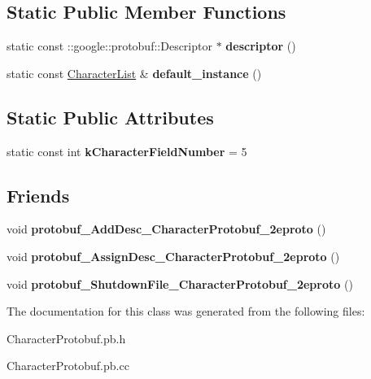 \subsection*{Static Public Member Functions}
\begin{DoxyCompactItemize}
\item 
static const \+::google\+::protobuf\+::\+Descriptor $\ast$ {\bfseries descriptor} ()\hypertarget{classCharacterList_aace6de641ed334c6d6a4cbbe7714ca8b}{}\label{classCharacterList_aace6de641ed334c6d6a4cbbe7714ca8b}

\item 
static const \hyperlink{classCharacterList}{Character\+List} \& {\bfseries default\+\_\+instance} ()\hypertarget{classCharacterList_aa180968dade6512bfa0e9c21b57b0b84}{}\label{classCharacterList_aa180968dade6512bfa0e9c21b57b0b84}

\end{DoxyCompactItemize}
\subsection*{Static Public Attributes}
\begin{DoxyCompactItemize}
\item 
static const int {\bfseries k\+Character\+Field\+Number} = 5\hypertarget{classCharacterList_a4290f8fc798d31c54076ae65c2401ca3}{}\label{classCharacterList_a4290f8fc798d31c54076ae65c2401ca3}

\end{DoxyCompactItemize}
\subsection*{Friends}
\begin{DoxyCompactItemize}
\item 
void {\bfseries protobuf\+\_\+\+Add\+Desc\+\_\+\+Character\+Protobuf\+\_\+2eproto} ()\hypertarget{classCharacterList_aa491aa56977170cd80caf7b8176ae84c}{}\label{classCharacterList_aa491aa56977170cd80caf7b8176ae84c}

\item 
void {\bfseries protobuf\+\_\+\+Assign\+Desc\+\_\+\+Character\+Protobuf\+\_\+2eproto} ()\hypertarget{classCharacterList_a510135aa7690c32c0b8f2f1b539199aa}{}\label{classCharacterList_a510135aa7690c32c0b8f2f1b539199aa}

\item 
void {\bfseries protobuf\+\_\+\+Shutdown\+File\+\_\+\+Character\+Protobuf\+\_\+2eproto} ()\hypertarget{classCharacterList_aa03453ef0dc13477cc670111c24af42a}{}\label{classCharacterList_aa03453ef0dc13477cc670111c24af42a}

\end{DoxyCompactItemize}


The documentation for this class was generated from the following files\+:\begin{DoxyCompactItemize}
\item 
Character\+Protobuf.\+pb.\+h\item 
Character\+Protobuf.\+pb.\+cc\end{DoxyCompactItemize}
